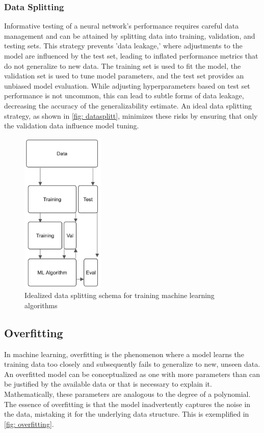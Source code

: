\subsubsection{Data Splitting}
Informative testing of a neural network's performance requires careful data management and can be attained by splitting data into training, validation, and testing sets\cite{Joseph2020}. This strategy prevents 'data leakage,' where adjustments to the model are influenced by the test set, leading to inflated performance metrics that do not generalize to new data. The training set is used to fit the model, the validation set is used to tune model parameters, and the test set provides an unbiased model evaluation. While adjusting hyperparameters based on test set performance is not uncommon, this can lead to subtle forms of data leakage, decreasing the accuracy of the generalizability estimate. An ideal data splitting strategy, as shown in \autoref{fig: datasplitt}, minimizes these risks by ensuring that only the validation data influence model tuning. 
\begin{figure}
    \centering
    \includegraphics[width=150px]{Figures/MLintro/data_split.png}
    \caption{Idealized data splitting schema for training machine learning algorithms}
    \label{fig: datasplitt}
\end{figure}

\subsection{Overfitting}
\label{subsec: overfitting}
In machine learning, overfitting is the phenomenon where a model learns the training data too closely and subsequently fails to generalize to new, unseen data. An overfitted model can be conceptualized as one with more parameters than can be justified by the available data or that is necessary to explain it\cite{Valdenegro-Toro2022}. Mathematically, these parameters are analogous to the degree of a polynomial. The essence of overfitting is that the model inadvertently captures the noise in the data, mistaking it for the underlying data structure. This is exemplified in \autoref{fig: overfitting}.

